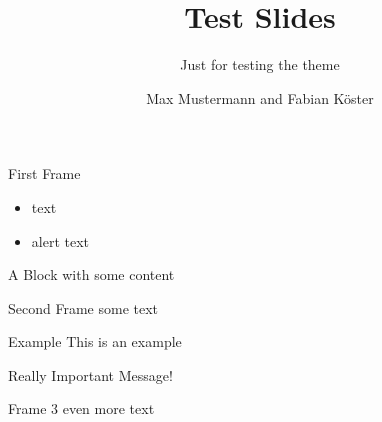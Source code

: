 \documentclass{beamer}
\title{Test Slides}
\subtitle{Just for testing the theme}
\author{Max Mustermann and Fabian Köster}
\begin{document}
\maketitle

\begin{frame}{First Frame}
  \begin{itemize}
  \item text
  \item \alert{alert text}
  \end{itemize}
  \begin{block}{A Block}
    with some content
  \end{block}
\end{frame}

\begin{frame}{Second Frame}
  some text
  \begin{exampleblock}{Example}
    This is an example
  \end{exampleblock}
\end{frame}

\begin{frame}[standout]
  Really Important Message!
\end{frame}

\begin{frame}{Frame 3}
  even more text
\end{frame}
\end{document}
